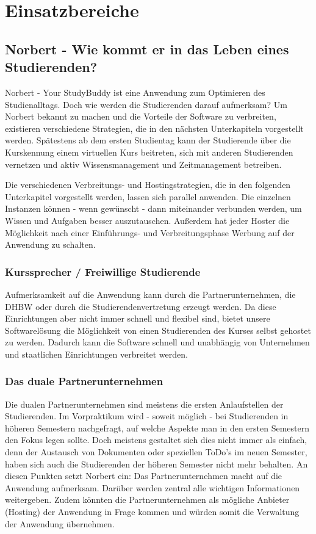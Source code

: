 
\chapter{Einsatzbereiche}
\section{Norbert - Wie kommt er in das Leben eines Studierenden?}
Norbert - Your StudyBuddy ist eine Anwendung zum Optimieren des Studienalltags. Doch wie werden die Studierenden darauf aufmerksam?
Um Norbert bekannt zu machen und die Vorteile der Software zu verbreiten, existieren verschiedene Strategien, die in den nächsten Unterkapiteln vorgestellt werden. Spätestens ab dem ersten Studientag kann der Studierende über die Kurskennung einem virtuellen Kurs beitreten, sich mit anderen Studierenden vernetzen und aktiv Wissensmanagement und Zeitmanagement betreiben.

Die verschiedenen Verbreitungs- und Hostingstrategien, die in den folgenden Unterkapitel vorgestellt werden, lassen sich parallel anwenden. Die einzelnen Instanzen können - wenn gewünscht - dann miteinander  verbunden werden, um Wissen und Aufgaben besser auszutauschen. Außerdem hat jeder Hoster die Möglichkeit nach einer Einführungs- und Verbreitungsphase Werbung auf der Anwendung zu schalten.

\subsection{Kurssprecher / Freiwillige Studierende}
Aufmerksamkeit auf die Anwendung kann durch die Partnerunternehmen, die DHBW oder durch die Studierendenvertretung erzeugt werden. Da diese Einrichtungen aber nicht immer schnell und flexibel sind, bietet unsere Softwarelösung die Möglichkeit von einen Studierenden des Kurses selbst gehostet zu werden. Dadurch kann die Software schnell und unabhängig von Unternehmen und staatlichen Einrichtungen verbreitet werden. 

\subsection{Das duale Partnerunternehmen}
Die dualen Partnerunternehmen sind meistens die ersten Anlaufstellen der Studierenden. Im Vorpraktikum wird  - soweit möglich - bei Studierenden in höheren Semestern nachgefragt, auf welche Aspekte man in den ersten Semestern den Fokus legen sollte. Doch meistens gestaltet sich dies nicht immer als einfach, denn der Austausch von Dokumenten oder speziellen ToDo's im neuen Semester, haben sich auch die Studierenden der höheren Semester nicht mehr behalten. An diesen Punkten setzt Norbert ein: Das Partnerunternehmen macht auf die Anwendung aufmerksam. Darüber werden zentral alle wichtigen Informationen weitergeben. Zudem könnten die Partnerunternehmen als mögliche Anbieter (Hosting) der Anwendung in Frage kommen und würden somit die Verwaltung der Anwendung übernehmen.

